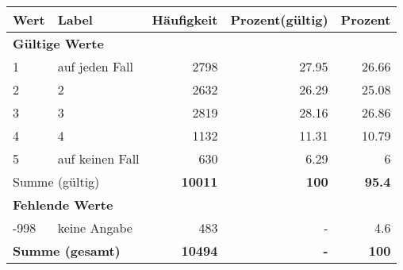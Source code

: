      \begin{longtable}{lXrrr}
     \toprule
     \textbf{Wert} & \textbf{Label} & \textbf{Häufigkeit} & \textbf{Prozent(gültig)} & \textbf{Prozent} \\
     \endhead
     \midrule
     \multicolumn{5}{l}{\textbf{Gültige Werte}}\\

     1 &
     \multicolumn{1}{X}{ auf jeden Fall   } &


       \num{2798} &
       \num[round-mode=places,round-precision=2]{27.95} &
         \num[round-mode=places,round-precision=2]{26.66} \\

     2 &
     \multicolumn{1}{X}{ 2   } &


       \num{2632} &
       \num[round-mode=places,round-precision=2]{26.29} &
         \num[round-mode=places,round-precision=2]{25.08} \\

     3 &
     \multicolumn{1}{X}{ 3   } &


       \num{2819} &
       \num[round-mode=places,round-precision=2]{28.16} &
         \num[round-mode=places,round-precision=2]{26.86} \\

     4 &
     \multicolumn{1}{X}{ 4   } &


       \num{1132} &
       \num[round-mode=places,round-precision=2]{11.31} &
         \num[round-mode=places,round-precision=2]{10.79} \\

     5 &
     \multicolumn{1}{X}{ auf keinen Fall   } &


       \num{630} &
       \num[round-mode=places,round-precision=2]{6.29} &
         \num[round-mode=places,round-precision=2]{6} \\
     \midrule
     \multicolumn{2}{l}{Summe (gültig)} &
       \textbf{\num{10011}} &
     \textbf{\num{100}} &
       \textbf{\num[round-mode=places,round-precision=2]{95.4}} \\
     \multicolumn{5}{l}{\textbf{Fehlende Werte}}\\
       -998 &
       keine Angabe &
         \num{483} &
        - &
         \num[round-mode=places,round-precision=2]{4.6} \\
     \midrule
     \multicolumn{2}{l}{\textbf{Summe (gesamt)}} &
          \textbf{\num{10494}} &
        \textbf{-} &
        \textbf{\num{100}} \\
     \bottomrule
     \end{longtable}
     
